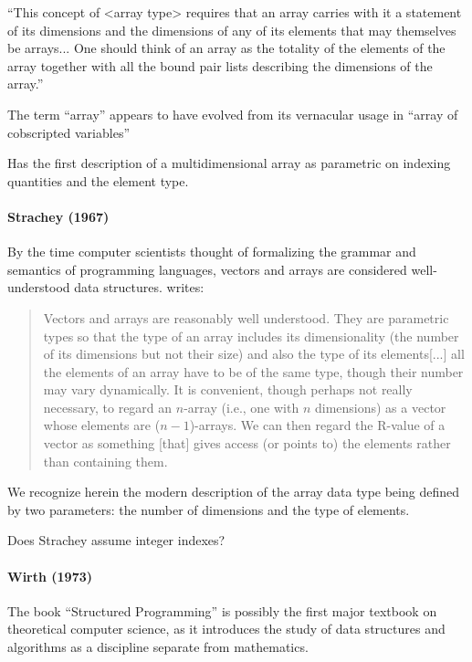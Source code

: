 ``This concept of <array type> requires that an array carries with it a
statement of its dimensions and the dimensions of any of its elements
that may themselves be arrays... One should think of an array as the
totality of the elements of the array together with all the bound pair
lists describing the dimensions of the array.''

The term ``array'' appears to have evolved from its vernacular usage in ``array of cobscripted variables''

Has the first description of a multidimensional array as parametric on indexing quantities and the element type.


\paragraph{Strachey (1967)~\cite{Strachey1967}}

By the time computer scientists thought of formalizing the grammar and semantics of programming languages,
vectors and arrays are considered well-understood data structures. \cite[\S 3.7.7, pp. 43--44]{Strachey1967} writes:
\begin{quote}
Vectors and arrays are reasonably well understood. They are parametric types so that the type of an array includes its dimensionality (the number of
its dimensions but not their size) and also the type of its elements[...]
all the elements of an array have to be of the same type, though their number may vary dynamically.
It is convenient, though perhaps not really necessary, to regard an $n$-array
(i.e., one with $n$ dimensions) as a vector whose elements are ($n-1$)-arrays.
We can then regard the R-value of a vector as something [that] gives access (or points to) the elements rather than containing them.
\end{quote}
We recognize herein the modern description of the array data type being defined by
two parameters: the number of dimensions and the type of elements.

Does Strachey assume integer indexes?


\paragraph{Wirth (1973)~\cite{Wirth1973}}

The book ``Structured Programming'' is possibly the first major textbook on theoretical computer science, as it introduces the study of data structures and algorithms as a discipline separate from mathematics.

